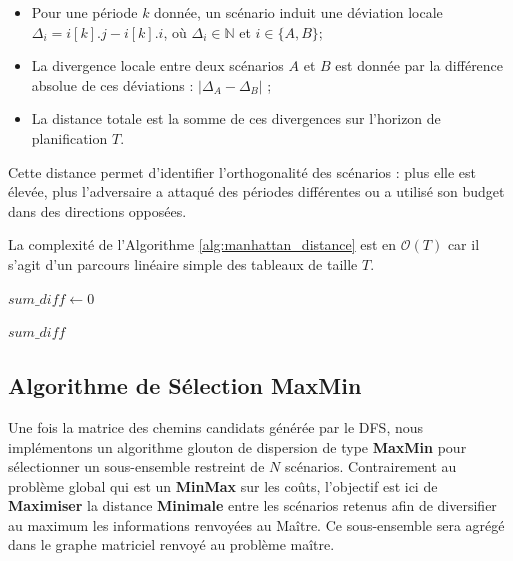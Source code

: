 \documentclass[11pt,a4paper]{article}
\begin{document}
\begin{itemize}
    \item Pour une période $k$ donnée, un scénario induit une déviation locale $\Delta_i = i[k].j - i[k].i$, où $\Delta_i\in\mathbb{N}$ et $i\in\{A, B\}$;
    \item La divergence locale entre deux scénarios $A$ et $B$ est donnée par la différence absolue de ces déviations : $|\Delta_A - \Delta_B|$ ;
    \item La distance totale est la somme de ces divergences sur l'horizon de planification $T$.
\end{itemize}

Cette distance permet d'identifier l'orthogonalité des scénarios : plus elle est élevée, plus l'adversaire a attaqué des périodes différentes ou a utilisé son budget dans des directions opposées.

La complexité de l'Algorithme \ref{alg:manhattan_distance} est en $\mathcal{O}(T)$ car il s'agit d'un parcours linéaire simple des tableaux de taille $T$.

{\small
    \begin{algorithm}[H]
        \caption{Calculate Manhattan distance (KCHOG)}
        \label{alg:manhattan_distance}
        
        
        
        $sum\_diff \gets 0$\;
        
        
        \Return $sum\_diff$\;
    \end{algorithm}
}

\newpage
\subsection{Algorithme de Sélection \textbf{MaxMin}}
\label{algo_maxmin}

Une fois la matrice des chemins candidats générée par le DFS, nous implémentons un algorithme glouton de dispersion de type \textbf{MaxMin} pour sélectionner un sous-ensemble restreint de $N$ scénarios. Contrairement au problème global qui est un \textbf{MinMax} sur les coûts, l'objectif est ici de \textbf{Maximiser} la distance \textbf{Minimale} entre les scénarios retenus afin de diversifier au maximum les informations renvoyées au Maître. Ce sous-ensemble sera agrégé dans le graphe matriciel renvoyé au problème maître.
\end{document}
